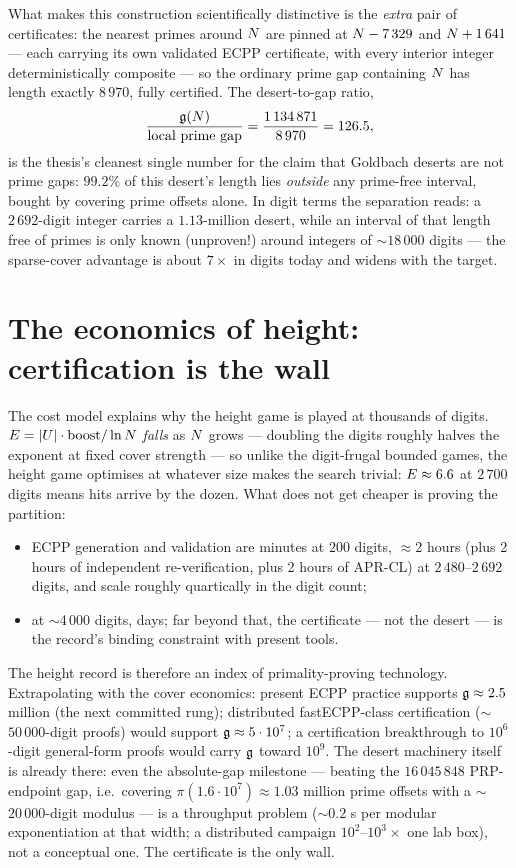 What makes this construction scientifically distinctive is the
\emph{extra} pair of certificates: the nearest primes around $N$ are
pinned at $N-7\,329$ and $N+1\,641$ --- each carrying its own
validated ECPP certificate, with every interior integer deterministically
composite --- so the ordinary prime gap containing $N$ has length
exactly $8\,970$, fully certified. The desert-to-gap ratio,
\[
\frac{\mathfrak{g}(N)}{\text{local prime gap}}
=\frac{1\,134\,871}{8\,970}=126.5,
\]
is the thesis's cleanest single number for the claim that Goldbach
deserts are not prime gaps: $99.2\%$ of this desert's length lies
\emph{outside} any prime-free interval, bought by covering prime
offsets alone. In digit terms the separation reads: a $2\,692$-digit
integer carries a $1.13$-million desert, while an interval of that
length free of primes is only known (unproven!) around integers of
$\sim$$18\,000$ digits --- the sparse-cover advantage is about
$7\times$ in digits today and widens with the target.

\section{The economics of height: certification is the wall}\label{sec:certwall}

The cost model explains why the height game is played at thousands of
digits. $E=|U|\cdot\mathrm{boost}/\ln N$ \emph{falls} as $N$ grows
--- doubling the digits roughly halves the exponent at fixed cover
strength --- so unlike the digit-frugal bounded games, the height game
optimises at whatever size makes the search trivial:
$E\approx6.6$ at $2\,700$ digits means hits arrive by the dozen. What
does not get cheaper is proving the partition:

\begin{itemize}
\item ECPP generation and validation are minutes at $200$ digits,
$\approx$2 hours (plus 2 hours of independent re-verification, plus
2 hours of APR-CL) at $2\,480$--$2\,692$ digits, and scale roughly
quartically in the digit count;
\item at $\sim$4\,000 digits, days; far beyond that, the certificate
--- not the desert --- is the record's binding constraint with present
tools.
\end{itemize}

The height record is therefore an index of primality-proving
technology. Extrapolating with the cover economics: present ECPP
practice supports $\mathfrak{g}\approx2.5$ million (the next committed rung);
distributed fastECPP-class certification ($\sim$$50\,000$-digit
proofs) would support $\mathfrak{g}\approx5\cdot10^7$; a certification
breakthrough to $10^6$-digit general-form proofs would carry
$\mathfrak{g}$ toward $10^9$. The desert machinery itself is already there: even
the absolute-gap milestone --- beating the $16\,045\,848$ PRP-endpoint
gap, i.e.\ covering $\pi(1.6\cdot10^7)\approx1.03$ million prime
offsets with a $\sim$$20\,000$-digit modulus --- is a throughput
problem ($\sim$$0.2$ s per modular exponentiation at that width; a
distributed campaign $10^2$--$10^3\times$ one lab box), not a
conceptual one. The certificate is the only wall.

